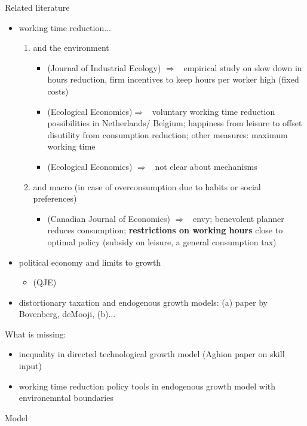 \documentclass[11pt,aspectratio=169]{beamer}
\newcommand{\ar}{$\Rightarrow$ \ }
\begin{document}
\begin{frame}[allowframebreaks]{Related literature}
\begin{itemize}
\begin{enumerate}
\begin{itemize}
\end{itemize}
\end{enumerate}
\item working time reduction...
\begin{enumerate}
\item and the environment
\begin{itemize}
\item \cite{Schor2005SustainableReduction}(Journal of Industrial Ecology) \ar empirical study on slow down in hours reduction, firm incentives to keep hours per worker high (fixed costs)
\item \cite{Pullinger2014WorkingDesign}(Ecological Economics)\ar voluntary working time reduction possibilities in Netherlands/ Belgium; happiness from leisure to  offset disutility from consumption reduction; other measures: maximum working time
\item \cite{Cieplinski2021EnvironmentalReductionb}(Ecological Economics) \ar not clear about mechanisms
\end{itemize}
\item and macro (in case of overconsumption due to habits or social preferences)
\begin{itemize}
\item \cite{Alvarez-Cuadrado2007EnvyHours}(Canadian Journal of Economics) \ar envy; benevolent planner reduces consumption; \textbf{restrictions on working hours} close to optimal policy (subsidy on leisure, a general consumption tax) 
\end{itemize}
\end{enumerate}
\item political economy and limits to growth
\begin{itemize}
\item \cite{Alesina1994DistributiveGrowth}(QJE)
\end{itemize}
\item distortionary taxation and endogenous growth models: (a) paper by Bovenberg, deMooji, (b)...
\end{itemize}
What is missing: 
\begin{itemize}
\item inequality in directed technological growth model (Aghion paper on skill input)
\item working time reduction policy tools in endogenous growth model with environemntal boundaries
\end{itemize}
\end{frame}

\begin{frame}{Model}

\end{frame}
\end{document}
